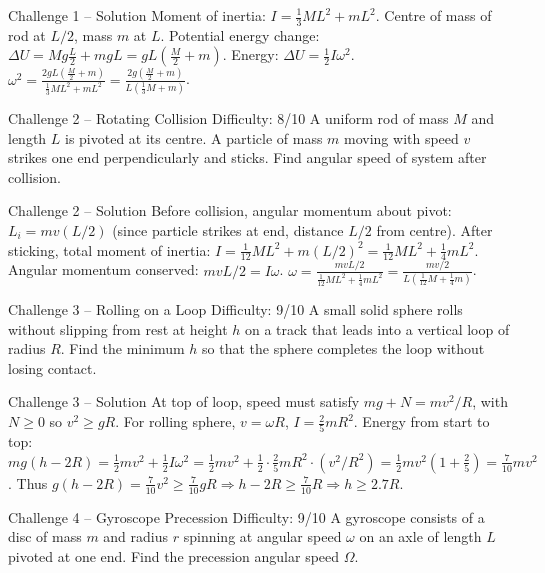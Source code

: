\documentclass[11pt]{beamer}
\begin{document}
\begin{frame}{Challenge 1 – Solution}
Moment of inertia: $I = \frac13 ML^2 + m L^2$.
Centre of mass of rod at $L/2$, mass $m$ at $L$. Potential energy change: $\Delta U = Mg\frac{L}{2} + mgL = gL\left(\frac{M}{2} + m\right)$.
Energy: $\Delta U = \frac12 I \omega^2$.
$\omega^2 = \frac{2gL\left(\frac{M}{2}+m\right)}{\frac13 ML^2 + m L^2} = \frac{2g\left(\frac{M}{2}+m\right)}{L\left(\frac13 M + m\right)}$.
\end{frame}

\begin{frame}[shrink=15]{Challenge 2 – Rotating Collision \hfill Difficulty: 8/10}
A uniform rod of mass $M$ and length $L$ is pivoted at its centre. A particle of mass $m$ moving with speed $v$ strikes one end perpendicularly and sticks. Find angular speed of system after collision.
\end{frame}

\begin{frame}{Challenge 2 – Solution}
Before collision, angular momentum about pivot: $L_i = m v (L/2)$ (since particle strikes at end, distance $L/2$ from centre). After sticking, total moment of inertia: $I = \frac{1}{12} M L^2 + m (L/2)^2 = \frac{1}{12} M L^2 + \frac14 m L^2$.
Angular momentum conserved: $m v L/2 = I \omega$.
$\omega = \frac{m v L/2}{\frac{1}{12} M L^2 + \frac14 m L^2} = \frac{m v /2}{L\left(\frac{1}{12} M + \frac14 m\right)}$.
\end{frame}

\begin{frame}[shrink=15]{Challenge 3 – Rolling on a Loop \hfill Difficulty: 9/10}
A small solid sphere rolls without slipping from rest at height $h$ on a track that leads into a vertical loop of radius $R$. Find the minimum $h$ so that the sphere completes the loop without losing contact.
\end{frame}

\begin{frame}[shrink=15]{Challenge 3 – Solution}
At top of loop, speed must satisfy $mg + N = mv^2/R$, with $N \ge 0$ so $v^2 \ge gR$. For rolling sphere, $v = \omega R$, $I = \frac25 mR^2$.
Energy from start to top: $mg(h - 2R) = \frac12 m v^2 + \frac12 I \omega^2 = \frac12 m v^2 + \frac12 \cdot \frac25 mR^2 \cdot (v^2/R^2) = \frac12 m v^2 (1 + \frac25) = \frac{7}{10} m v^2$.
Thus $g(h - 2R) = \frac{7}{10} v^2 \ge \frac{7}{10} gR \Rightarrow h - 2R \ge \frac{7}{10} R \Rightarrow h \ge 2.7 R$.
\end{frame}

\begin{frame}[shrink=15]{Challenge 4 – Gyroscope Precession \hfill Difficulty: 9/10}
A gyroscope consists of a disc of mass $m$ and radius $r$ spinning at angular speed $\omega$ on an axle of length $L$ pivoted at one end. Find the precession angular speed $\Omega$.
\end{frame}
\end{document}
